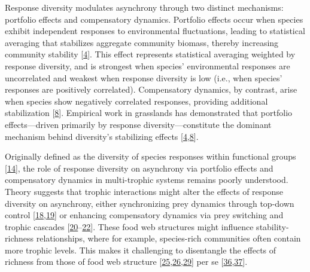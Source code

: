 \documentclass[
]{article}
\begin{document}
Response diversity modulates asynchrony through two distinct mechanisms:
portfolio effects and compensatory dynamics. Portfolio effects occur when
species exhibit independent responses to environmental fluctuations, leading to
statistical averaging that stabilizes aggregate community biomass, thereby
increasing community stability {[}\protect\hyperlink{ref-doak_statistical_1998}{4}{]}. This effect represents
statistical averaging weighted by response diversity, and is strongest when
species' environmental responses are uncorrelated and weakest when response
diversity is low (i.e., when species' responses are positively correlated).
Compensatory dynamics, by contrast, arise when species show negatively
correlated responses, providing additional stabilization
{[}\protect\hyperlink{ref-zhao_biodiversity_2022}{8}{]}. Empirical work in grasslands has demonstrated that
portfolio effects---driven primarily by response diversity---constitute the
dominant mechanism behind diversity's stabilizing effects
{[}\protect\hyperlink{ref-doak_statistical_1998}{4},\protect\hyperlink{ref-zhao_biodiversity_2022}{8}{]}.

Originally defined as the diversity of species responses within functional
groups {[}\protect\hyperlink{ref-elmqvist_response_2003}{14}{]}, the role of response diversity on asynchrony
via portfolio effects and compensatory dynamics in multi-trophic systems
remains poorly understood. Theory suggests that trophic interactions might
alter the effects of response diversity on asynchrony, either synchronizing
prey dynamics through top-down control {[}\protect\hyperlink{ref-raimondo_interspecific_2004}{18},\protect\hyperlink{ref-korpimaki_predatorinduced_2005}{19}{]} or enhancing compensatory dynamics via prey
switching and trophic cascades {[}\protect\hyperlink{ref-mccann_weak_1998}{20}--\protect\hyperlink{ref-fahimipour_compensation_2017}{22}{]}. These food web
structures might influence stability-richness relationships, where for example,
species-rich communities often contain more trophic levels. This makes it
challenging to disentangle the effects of richness from those of food web
structure {[}\protect\hyperlink{ref-danet_species_2021}{25},\protect\hyperlink{ref-eschenbrenner_diversity_2023}{26},\protect\hyperlink{ref-thebault_trophic_2005}{29}{]} per se {[}\protect\hyperlink{ref-dunne_network_2006}{36},\protect\hyperlink{ref-galiana_spatial_2018}{37}{]}.
\end{document}
